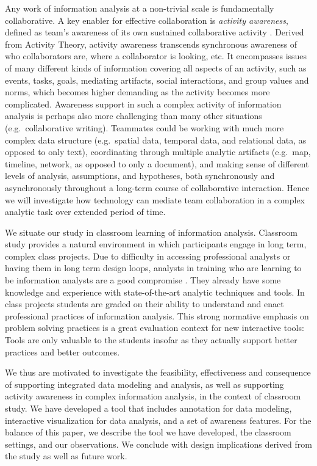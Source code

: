 Any work of information analysis at a non-trivial scale is fundamentally
collaborative. A key enabler for effective collaboration is
\emph{activity awareness}, defined as team's awareness of its own
sustained collaborative activity \autocite{Carroll2006}. Derived from
Activity Theory, activity awareness transcends synchronous awareness of
who collaborators are, where a collaborator is looking, etc. It
encompasses issues of many different kinds of information covering all
aspects of an activity, such as events, tasks, goals, mediating
artifacts, social interactions, and group values and norms, which
becomes higher demanding as the activity becomes more complicated.
Awareness support in such a complex activity of information analysis is
perhaps also more challenging than many other situations
(e.g.~collaborative writing). Teammates could be working with much more
complex data structure (e.g.~spatial data, temporal data, and relational
data, as opposed to only text), coordinating through multiple analytic
artifacts (e.g.~map, timeline, network, as opposed to only a document),
and making sense of different levels of analysis, assumptions, and
hypotheses, both synchronously and asynchronously throughout a long-term
course of collaborative interaction. Hence we will investigate how
technology can mediate team collaboration in a complex analytic task
over extended period of time.

We situate our study in classroom learning of information analysis.
Classroom study provides a natural environment in which participants
engage in long term, complex class projects. Due to difficulty in
accessing professional analysts or having them in long term design
loops, analysts in training who are learning to be information analysts
are a good compromise \autocite{Kang2011}. They already have some
knowledge and experience with state-of-the-art analytic techniques and
tools. In class projects students are graded on their ability to
understand and enact professional practices of information analysis.
This strong normative emphasis on problem solving practices is a great
evaluation context for new interactive tools: Tools are only valuable to
the students insofar as they actually support better practices and
better outcomes.

We thus are motivated to investigate the feasibility, effectiveness and
consequence of supporting integrated data modeling and analysis, as well
as supporting activity awareness in complex information analysis, in the
context of classroom study. We have developed a tool that includes
annotation for data modeling, interactive visualization for data
analysis, and a set of awareness features. For the balance of this
paper, we describe the tool we have developed, the classroom settings,
and our observations. We conclude with design implications derived from
the study as well as future work.